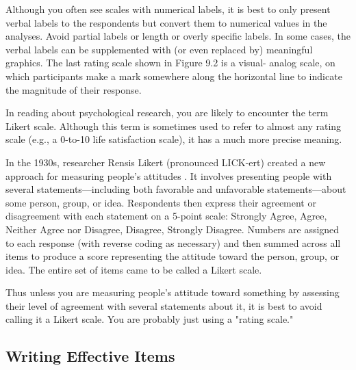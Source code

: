 Although you often see scales with numerical labels, it is best to only present verbal labels to the respondents but convert them to numerical values in the analyses. Avoid partial labels or length or overly specific labels. In some cases, the verbal labels can be supplemented with (or even replaced by) meaningful graphics. The last rating scale shown in Figure 9.2 is a visual- analog scale, on which participants make a mark somewhere along the horizontal line to indicate the magnitude of their response.


\color{fgcolor}\begin{kframe}



In reading about psychological research, you are likely to encounter the term Likert scale. Although this term is sometimes used to refer to almost any rating scale (e.g., a 0-to-10 life satisfaction scale), it has a much more precise meaning.


In the 1930s, researcher Rensis Likert (pronounced LICK-ert) created a new approach for measuring people’s attitudes \citep{likert_technique_1932}. It involves presenting people with several statements---including both favorable and unfavorable statements---about some person, group, or idea. Respondents then express their agreement or disagreement with each statement on a 5-point scale: Strongly Agree, Agree, Neither Agree nor Disagree, Disagree, Strongly Disagree. Numbers are assigned to each response (with reverse coding as necessary) and then summed across all items to produce a score representing the attitude toward the person, group, or idea. The entire set of items came to be called a Likert scale.


Thus unless you are measuring people’s attitude toward something by assessing their level of agreement with several statements about it, it is best to avoid calling it a Likert scale. You are probably just using a "rating scale."

\end{kframe}



\subsection{Writing Effective Items}


